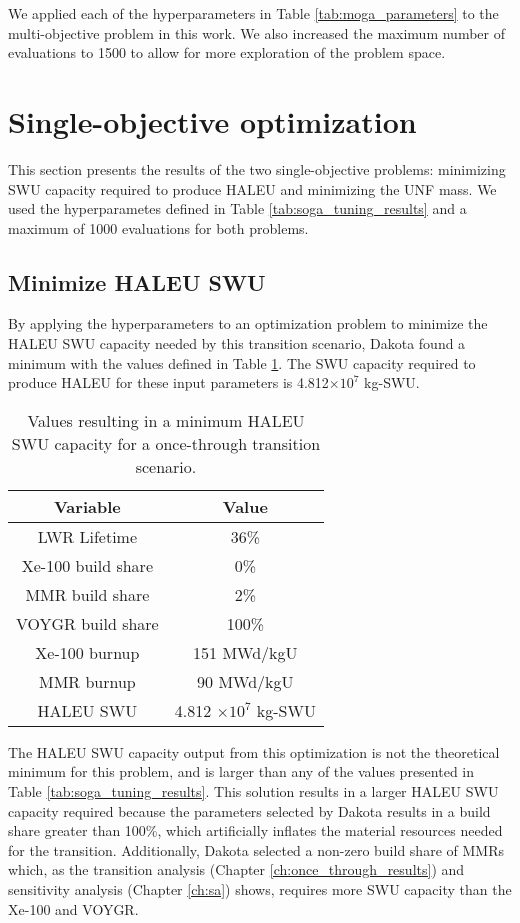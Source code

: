 We applied each of the hyperparameters in Table \ref{tab:moga_parameters}
to the multi-objective problem in this work. We also increased the 
maximum number of evaluations to 1500 to allow for more exploration 
of the problem space.

\section{Single-objective optimization}
This section presents the results of the two single-objective 
problems: minimizing \gls{SWU} capacity required to produce 
\gls{HALEU} and minimizing the \gls{UNF} mass. We used the hyperparametes 
defined in Table \ref{tab:soga_tuning_results} and a maximum 
of 1000 evaluations for both problems. 

\subsection{Minimize HALEU SWU}
By applying the hyperparameters to an optimization problem to minimize the 
\gls{HALEU} \gls{SWU} capacity needed by this transition scenario, Dakota
found a minimum with the values defined in Table \ref{tab:soga_ot_haleu}.
The \gls{SWU} capacity required to produce \gls{HALEU} for these input 
parameters is 4.812$\times 10^7$ kg-SWU.

\begin{table}[h!]
    \centering 
    \caption{Values resulting in a minimum \gls{HALEU} \gls{SWU} capacity for 
              a once-through transition scenario.}
    \label{tab:soga_ot_haleu}
    \begin{tabular}{c c}
        \hline
        Variable & Value \\
        \hline
        LWR Lifetime & 36\%\\
        Xe-100 build share & 0\%\\
        MMR build share & 2\%\\
        VOYGR build share & 100\%\\
        Xe-100 burnup & 151 MWd/kgU\\
        MMR burnup & 90 MWd/kgU\\
        \hline
        HALEU SWU & 4.812 $\times 10^7$ kg-SWU\\
        \hline
    \end{tabular}
\end{table}

The \gls{HALEU} \gls{SWU} capacity output from this optimization is not the
theoretical minimum for this problem, and is larger than any of the values 
presented in Table \ref{tab:soga_tuning_results}. This solution results in 
a larger \gls{HALEU} \gls{SWU} capacity required because the parameters selected 
by Dakota results in a build share greater than 100\%, which artificially 
inflates the material resources needed for the transition. Additionally, 
Dakota selected a non-zero build share of \glspl{MMR} which, as the transition 
analysis (Chapter \ref{ch:once_through_results}) and sensitivity analysis 
(Chapter \ref{ch:sa}) shows, requires more \gls{SWU} capacity than 
the Xe-100 and VOYGR. 

